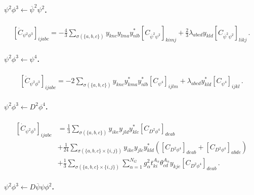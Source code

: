 \paragraph{\texorpdfstring{$\psi^2 \phi^3 \leftarrow \overline \psi^2 \psi^2$.}{psi2phi3frompsibar2psi2}}
\begin{align}
    \left[\dot C_{\psi^2\phi^3}\right]_{ijabc} = - \frac{4}{3}\sum_{\sigma(\{a,b,c\})} y_{knc}y_{lma}y^*_{nlb} \left[C_{\overline \psi^2 \psi^2}\right]_{kimj} + \frac{2}{3}\lambda_{abcd}y_{kld} \left[C_{\overline \psi^2 \psi^2}\right]_{likj} \,.\label{psi2phi3_psibar2psi2}
\end{align}

\paragraph{\texorpdfstring{$\psi^2 \phi^3 \leftarrow \psi^4$.}{psi2phi3frompsi4}}

\begin{align}
    \left[\dot C_{\psi^2\phi^3}\right]_{ijabc} = -2 \sum_{\sigma(\{a,b,c\})}y_{knc}y_{kma}^*y^*_{nlb}\left[C_{\psi^4}\right]_{ijlm} + \lambda_{abcd}y^*_{kld} \left[C_{\psi^4}\right]_{ijkl}\,.
    \label{psi2phi3_psi4}
\end{align}

\paragraph{\texorpdfstring{$\psi^2 \phi^3 \leftarrow D^2\phi^4$.}{psi2phi3fromD2phi4}}

\begin{align}
    \left[\dot C_{\psi^2\phi^3}\right]_{ijabc} &= 
    \frac{1}{3}\sum_{\sigma(\{a,b,c\})}
    y_{ike}y_{jld}y^*_{klc} \left[C_{D^2\phi^4}\right]_{deab}
    \nonumber \\&
    + \frac{1}{24} \sum_{\sigma(\{a,b,c\} \times \{i,j\})} y_{ike}y_{jlc}y^*_{kld} \left(\left[C_{D^2\phi^4}\right]_{deab} + \left[C_{D^2\phi^4}\right]_{abde} 
    \right)\nonumber\\
    & +\frac{1}{3} \sum_{\sigma(\{a,b,c\} \times \{i,j\})} \sum_{\alpha=1}^{N_G} g_\alpha^2 t_{ki}^{A_\alpha}  \theta_{cd}^{A_\alpha} y_{kje} \left[C_{D^2\phi^4}\right]_{deab}\,.
    \label{psi2phi3_D2phi4}
\end{align}

\paragraph{\texorpdfstring{$\psi^2 \phi^3 \leftarrow D\overline\psi\psi\phi^2$}{psi2phi3fromDpsibarpsiphi2}.}

